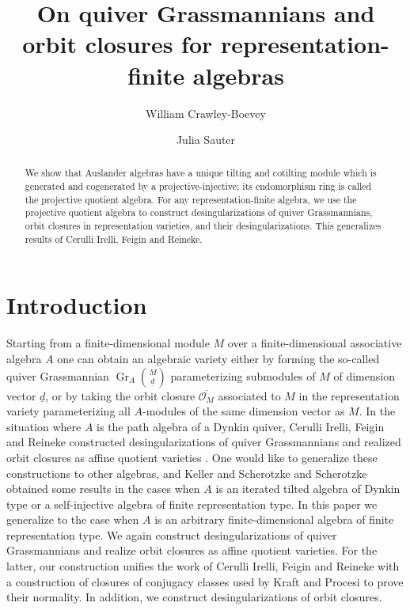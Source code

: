 \documentclass[11pt,a4paper]{amsart}
\theoremstyle{plain}
\theoremstyle{definition}
\begin{document}
\title{On quiver Grassmannians and orbit closures for representation-finite algebras}

\author{William Crawley-Boevey}
\address{Department of Pure Mathematics, University of Leeds, Leeds LS2 9JT, UK}

\author{Julia Sauter}
\address{Fakult\"at f\"ur Mathematik, Universit\"at Bielefeld, Postfach 100 131, D-33501 Bielefeld, Germany}



\begin{abstract}
We show that Auslander algebras have a unique tilting and cotilting module which is generated and cogenerated by a projective-injective; its endomorphism ring is called the projective quotient algebra.  
For any representation-finite algebra, we use the projective quotient algebra to construct desingularizations of quiver Grassmannians, orbit closures in representation varieties, and their desingularizations. This generalizes results of Cerulli Irelli, Feigin and Reineke. 
\end{abstract}
\maketitle

\section{Introduction}
Starting from a finite-dimensional module $M$ over a finite-dimensional associative algebra $A$ one can obtain an algebraic variety either by forming the so-called quiver Grassmannian 
${\operatorname{Gr}_A \binom{M}{\underline{d}}}$ parameterizing submodules of $M$ of dimension vector ${\underline{d}}$, or by taking the orbit closure 
$\overline{{\mathcal{O}}_M}$ associated to $M$ in the representation variety parameterizing all $A$-modules of the 
same dimension vector as $M$.
In the situation where $A$ is the path algebra of a Dynkin quiver, Cerulli Irelli, Feigin and Reineke 
constructed desingularizations of quiver Grassmannians \cite{CIFR} and realized orbit closures 
as affine quotient varieties \cite{CFR}. One would like to generalize these constructions
to other algebras, and Keller and Scherotzke \cite{KS2} and Scherotzke \cite{Sch} obtained some results in the cases when $A$ is an iterated tilted algebra of Dynkin type or a self-injective algebra of finite representation type.
In this paper we generalize to the case when $A$ is an arbitrary finite-dimensional algebra of finite representation type.
We again construct desingularizations of quiver Grassmannians and realize orbit closures as affine quotient varieties. 
For the latter, our construction unifies the work of Cerulli Irelli, Feigin and Reineke
with a construction of closures of conjugacy classes used by Kraft and Procesi \cite{KP} to prove their normality.
In addition, we construct desingularizations of orbit closures.
\end{document}

